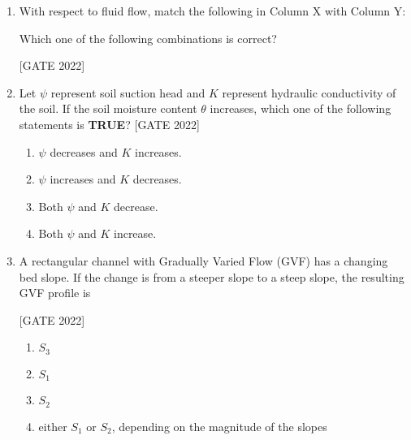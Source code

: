 \documentclass[journal,12pt,onecolumn]{IEEEtran}
\theoremstyle{remark}
\begin{document}
\begin{enumerate}
\item With respect to fluid flow, match the following in Column X with Column Y:



Which one of the following combinations is correct?

\hfill{[GATE 2022]}\begin{enumerate}
\end{enumerate}

\item Let  $ \psi  $ represent soil suction head and  $ K  $ represent hydraulic conductivity of the soil. If the soil moisture content  $ \theta  $ increases, which one of the following statements is \textbf{TRUE}?
\hfill{[GATE 2022]}
\begin{multicols}{2}
\begin{enumerate}
    \item  $ \psi  $ decreases and  $ K  $ increases.
    \item  $ \psi  $ increases and  $ K  $ decreases.
    \item Both  $ \psi  $ and  $ K  $ decrease.
    \item Both  $ \psi  $ and  $ K  $ increase.
\end{enumerate}
\end{multicols}

\item A rectangular channel with Gradually Varied Flow (GVF) has a changing bed slope. If the change is from a steeper slope to a steep slope, the resulting GVF profile is

\hfill{[GATE 2022]}\begin{enumerate}
    \item  $ S_3  $
    \item  $ S_1  $
    \item  $ S_2  $
    \item either  $ S_1  $ or  $ S_2  $, depending on the magnitude of the slopes
\end{enumerate}


\end{enumerate}
\end{document}
